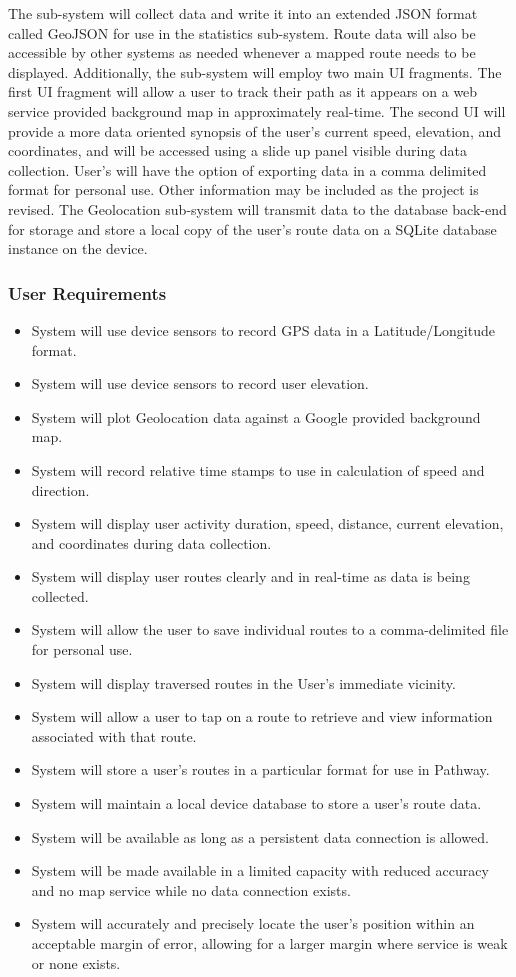 \documentclass{article}
\begin{document}
The sub-system will collect data and write it into an extended JSON format called GeoJSON for use in the statistics sub-system. Route data will also be accessible by other systems as needed whenever a mapped route needs to be displayed. Additionally, the sub-system will employ two main UI fragments. The first UI fragment will allow a user to track their path as it appears on a web service provided background map in approximately real-time. The second UI will provide a more data oriented synopsis of the user’s current speed, elevation, and coordinates, and will be accessed using a slide up panel visible during data collection. User’s will have the option of exporting data in a comma delimited format for personal use. Other information may be included as the project is revised. The Geolocation sub-system will transmit data to the database back-end for storage and store a local copy of the user's route data on a SQLite database instance on the device.

\subsubsection{User Requirements}
\begin{itemize}
    \item System will use device sensors to record GPS data in a Latitude/Longitude format.
    \item System will use device sensors to record user elevation.
    \item System will plot Geolocation data against a Google provided background map.
    \item System will record relative time stamps to use in calculation of speed and direction.
    \item System will display user activity duration, speed, distance, current elevation, and coordinates during data collection.
    \item System will display user routes clearly and in real-time as data is being collected.
    \item System will allow the user to save individual routes to a comma-delimited file for personal use.
    \item System will display traversed routes in the User's immediate vicinity.
    \item System will allow a user to tap on a route to retrieve and view information associated with that route.
    \item System will store a user’s routes in a particular format for use in Pathway.
    \item System will maintain a local device database to store a user's route data.
    \item System will be available as long as a persistent data connection is allowed.
    \item System will be made available in a limited capacity with reduced accuracy and no map service while no data connection exists.
    \item System will accurately and precisely locate the user’s position within an acceptable margin of error, allowing for a larger margin where service is weak or none exists.
\end{itemize}
\end{document}

